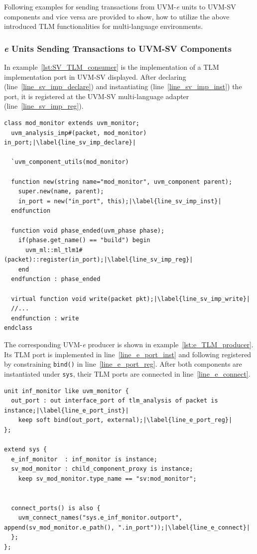 Following examples for sending transactions from UVM-\textit{e} units to UVM-SV components and
vice versa are provided to show, how to utilize the above introduced TLM functionalities for multi-language
environments.
\subsubsection{\textit{e} Units Sending Transactions to UVM-SV Components}
In example~\ref{lst:SV_TLM_consumer} is the implementation of a TLM implementation port in UVM-SV
displayed. After declaring (line~\ref{line_sv_imp_declare}) and instantiating (line~\ref{line_sv_imp_inst}) the port, it
is registered at the UVM-SV multi-language adapter (line~\ref{line_sv_imp_reg}).
\lstset{language=SystemVerilog, numbers = left, escapechar=|, breaklines=true}
\begin{lstlisting}[frame=htrbl, caption={SystemVerilog: consumer side of a TLM connection},
label={lst:SV_TLM_consumer}]
class mod_monitor extends uvm_monitor;
  uvm_analysis_imp#(packet, mod_monitor) in_port;|\label{line_sv_imp_declare}|
  
  `uvm_component_utils(mod_monitor)
  
  function new(string name="mod_monitor", uvm_component parent);
    super.new(name, parent);
    in_port = new("in_port", this);|\label{line_sv_imp_inst}|
  endfunction 
  
  function void phase_ended(uvm_phase phase);
    if(phase.get_name() == "build") begin
      uvm_ml::ml_tlm1#(packet)::register(in_port);|\label{line_sv_imp_reg}|
    end
  endfunction : phase_ended
  
  virtual function void write(packet pkt);|\label{line_sv_imp_write}|
  //...
  endfunction : write
endclass
\end{lstlisting}
The corresponding UVM-\textit{e} producer is shown in example~\ref{lst:e_TLM_producer}. Its TLM port is implemented in
line~\ref{line_e_port_inst} and following registered by constraining \lstinline$bind()$ in line~\ref{line_e_port_reg}.
After both components are instantiated under \lstinline$sys$, their TLM ports are connected in line~\ref{line_e_connect}.
\lstset{language=e, numbers = left, escapechar=|, breaklines=true}
\begin{lstlisting}[frame=htrbl, caption={\textit{e}: producer side of a TLM connection},
label={lst:e_TLM_producer}]
unit inf_monitor like uvm_monitor {
  out_port : out interface_port of tlm_analysis of packet is instance;|\label{line_e_port_inst}|
    keep soft bind(out_port, external);|\label{line_e_port_reg}|
};

extend sys {
  e_inf_monitor  : inf_monitor is instance;
  sv_mod_monitor : child_component_proxy is instance;
    keep sv_mod_monitor.type_name == "sv:mod_monitor";
  
    
  connect_ports() is also {
    uvm_connect_names("sys.e_inf_monitor.outport", append(sv_mod_monitor.e_path(), ".in_port"));|\label{line_e_connect}|
  };  
};
\end{lstlisting}

